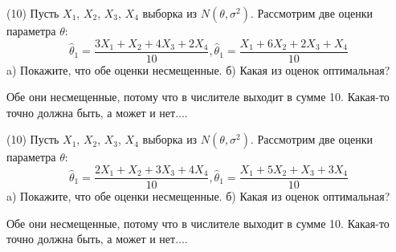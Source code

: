 \begin{problem}
(10) Пусть $X _{1}$, $X _{2}$, $X _{3}$, $X _{4}$ выборка из $N(\theta, \sigma ^{2})$. Рассмотрим две оценки параметра $\theta$:
\[\hat \theta _{1} = \frac{3X _{1} + X _{2} + 4X _{3} + 2X _{4}}{10}, \hat \theta _{1} = \frac{X _{1} + 6X _{2} + 2X _{3} + X _{4}}{10}\]
a) Покажите, что обе оценки несмещенные.
б) Какая из оценок оптимальная?
\end{problem}
\begin{solution}
Обе они несмещенные, потому что в числителе выходит в сумме 10.
Какая-то точно должна быть, а может и нет....
\end{solution}
\begin{problem}
(10) Пусть $X _{1}$, $X _{2}$, $X _{3}$, $X _{4}$ выборка из $N(\theta, \sigma ^{2})$. Рассмотрим две оценки параметра $\theta$:
\[\hat \theta _{1} = \frac{2X _{1} + X _{2} + 3X _{3} + 4X _{4}}{10}, \hat \theta _{1} = \frac{X _{1} + 5X _{2} + X _{3} + 3X _{4}}{10}\]
a) Покажите, что обе оценки несмещенные.
б) Какая из оценок оптимальная?
\end{problem}
\begin{solution}
Обе они несмещенные, потому что в числителе выходит в сумме 10.
Какая-то точно должна быть, а может и нет....
\end{solution}